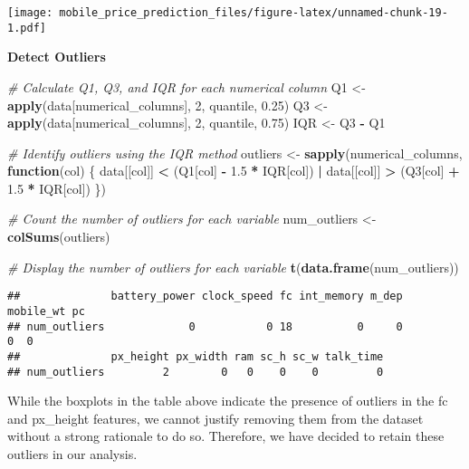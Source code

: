 \documentclass[
]{article}
\newenvironment{Shaded}{\begin{snugshade}}{\end{snugshade}}
\newcommand{\CommentTok}[1]{\textcolor[rgb]{0.56,0.35,0.01}{\textit{#1}}}
\newcommand{\ControlFlowTok}[1]{\textcolor[rgb]{0.13,0.29,0.53}{\textbf{#1}}}
\newcommand{\DecValTok}[1]{\textcolor[rgb]{0.00,0.00,0.81}{#1}}
\newcommand{\FloatTok}[1]{\textcolor[rgb]{0.00,0.00,0.81}{#1}}
\newcommand{\FunctionTok}[1]{\textcolor[rgb]{0.13,0.29,0.53}{\textbf{#1}}}
\newcommand{\NormalTok}[1]{#1}
\newcommand{\OtherTok}[1]{\textcolor[rgb]{0.56,0.35,0.01}{#1}}
\newcommand{\SpecialCharTok}[1]{\textcolor[rgb]{0.81,0.36,0.00}{\textbf{#1}}}
\begin{document}
\texttt{[image: mobile\_price\_prediction\_files/figure-latex/unnamed-chunk-19-1.pdf]}

\textbf{Detect Outliers}

\begin{Shaded}
\begin{Highlighting}[]
\CommentTok{\# Calculate Q1, Q3, and IQR for each numerical column}
\NormalTok{Q1 }\OtherTok{\textless{}{-}} \FunctionTok{apply}\NormalTok{(data[numerical\_columns], }\DecValTok{2}\NormalTok{, quantile, }\FloatTok{0.25}\NormalTok{)}
\NormalTok{Q3 }\OtherTok{\textless{}{-}} \FunctionTok{apply}\NormalTok{(data[numerical\_columns], }\DecValTok{2}\NormalTok{, quantile, }\FloatTok{0.75}\NormalTok{)}
\NormalTok{IQR }\OtherTok{\textless{}{-}}\NormalTok{ Q3 }\SpecialCharTok{{-}}\NormalTok{ Q1}

\CommentTok{\# Identify outliers using the IQR method}
\NormalTok{outliers }\OtherTok{\textless{}{-}} \FunctionTok{sapply}\NormalTok{(numerical\_columns, }\ControlFlowTok{function}\NormalTok{(col) \{}
\NormalTok{  data[[col]] }\SpecialCharTok{\textless{}}\NormalTok{ (Q1[col] }\SpecialCharTok{{-}} \FloatTok{1.5} \SpecialCharTok{*}\NormalTok{ IQR[col]) }\SpecialCharTok{|}\NormalTok{ data[[col]] }\SpecialCharTok{\textgreater{}}\NormalTok{ (Q3[col] }\SpecialCharTok{+} \FloatTok{1.5} \SpecialCharTok{*}\NormalTok{ IQR[col])}
\NormalTok{\})}

\CommentTok{\# Count the number of outliers for each variable}
\NormalTok{num\_outliers }\OtherTok{\textless{}{-}} \FunctionTok{colSums}\NormalTok{(outliers)}

\CommentTok{\# Display the number of outliers for each variable}
\FunctionTok{t}\NormalTok{(}\FunctionTok{data.frame}\NormalTok{(num\_outliers))}
\end{Highlighting}
\end{Shaded}

\begin{verbatim}
##              battery_power clock_speed fc int_memory m_dep mobile_wt pc
## num_outliers             0           0 18          0     0         0  0
##              px_height px_width ram sc_h sc_w talk_time
## num_outliers         2        0   0    0    0         0
\end{verbatim}

While the boxplots in the table above indicate the presence of outliers
in the fc and px\_height features, we cannot justify removing them from
the dataset without a strong rationale to do so. Therefore, we have
decided to retain these outliers in our analysis.
\end{document}
